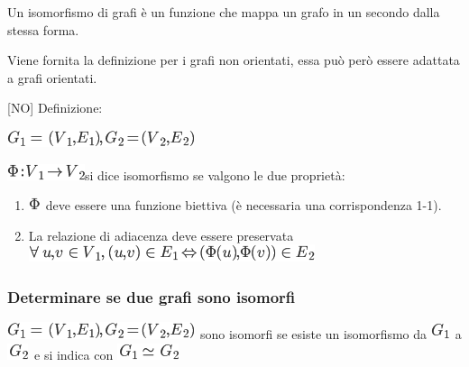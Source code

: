 \documentclass{article}
\providecommand{\tightlist}{%
  \setlength{\itemsep}{0pt}\setlength{\parskip}{0pt}}
\begin{document}
{}

{Un isomorfismo di grafi è un funzione che mappa un grafo in un secondo
dalla stessa forma.}

{Viene fornita la definizione per i grafi non orientati, essa può però
essere adattata a grafi orientati.}

{}

{{[}NO{]} Definizione:}

\includegraphics{images/image426.png}

\includegraphics{images/image427.png}{si dice isomorfismo se valgono le
due proprietà:}

\begin{enumerate}
\tightlist
\item
  \includegraphics{images/image428.png}{~deve essere una funzione
  biettiva (è necessaria una corrispondenza 1-1).}
\item
  {La relazione di adiacenza deve essere preservata\\
  }\includegraphics{images/image429.png}
\end{enumerate}

{}

\hypertarget{h.umjijdswjd6a}{\subsubsection{\texorpdfstring{{Determinare
se due grafi sono
isomorfi}}{Determinare se due grafi sono isomorfi}}\label{h.umjijdswjd6a}}

{}

\includegraphics{images/image426.png}{~s}{ono isomorfi se esiste un
isomorfismo da
}\includegraphics{images/image430.png}{~}{a}\includegraphics{images/image431.png}{~}{e
si indica con }\includegraphics{images/image432.png}
\end{document}
